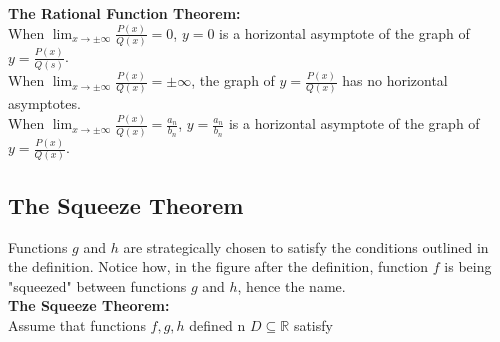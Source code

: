         \begin{center}
        \end{center}

        \noindent \color{purple} \textbf{The Rational Function Theorem:} \color{black} \\
        \noindent When $\lim_{x\to\pm\infty}\frac{P(x)}{Q(x)}=0$, $y=0$ is a horizontal asymptote
        of the graph of $y=\frac{P(x)}{Q(s)}$. \\
        When $\lim_{x\to\pm\infty}\frac{P(x)}{Q(x)}=\pm\infty$, the graph of $y=\frac{P(x)}{Q(x)}$
        has no horizontal asymptotes. \\
        When $\lim_{x\to\pm\infty}\frac{P(x)}{Q(x)}=\frac{a_n}{b_n}$, $y=\frac{a_n}{b_n}$ is a
        horizontal asymptote of the graph of $y=\frac{P(x)}{Q(x)}$.

    \pagebreak
    \subsection{The Squeeze Theorem}
        Functions $g$ and $h$ are strategically chosen to satisfy the conditions outlined in the
        definition. Notice how, in the figure after the definition, function $f$ is being
        "squeezed" between functions $g$ and $h$, hence the name. \\

        \noindent \color{purple} \textbf{The Squeeze Theorem:} \color{black} \\
        Assume that functions $f,g,h$ defined n $D\subseteq\mathbb{R}$ satisfy \\

